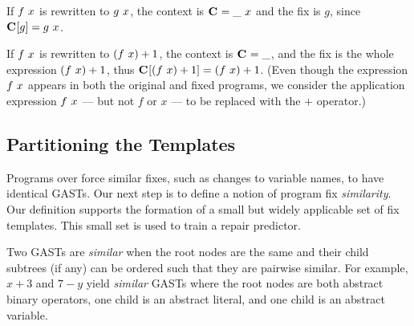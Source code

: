  If $f\ x$ is rewritten to $g\ x$, the context is
$\mathbf{C}_{} = \_\ x$ and the fix is $g$, since $\mathbf{C}_{}[g] = g\ x$.

If $f\ x$ is rewritten to $(f\ x) + 1$, the context is
$\mathbf{C}_{} = \_$, and the fix is the whole expression
$(f\ x) + 1$, thus $\mathbf{C}_{}[(f\ x) + 1] =
(f\ x) + 1$. (Even though the expression $f\ x$ appears in
both the original and fixed programs, we consider the application expression
$f\ x$ --- but not $f$ or $x$ --- to be replaced with the $+$ operator.)

\subsection{Partitioning the Templates}

Programs over \lang force similar fixes, such as changes to variable names, to
have identical GASTs. Our next step is to define a notion of program fix
\emph{similarity}. Our definition supports the formation of a small but widely
applicable set of fix templates. This small set is used to train a repair
predictor.

\label{subsec:partitioning}



Two GASTs are \emph{similar} when
the root nodes are the same and their child subtrees (if any) can be ordered
such that they are pairwise similar. For example, $x + 3$ and $7 - y$ yield
\emph{similar} GASTs where the root nodes are both abstract binary operators,
one child is an abstract literal, and one child is an abstract variable.

